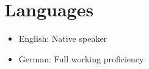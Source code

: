 \documentclass[10pt,a4paper]{article}
\begin{document}
\vspace{1.2em}

\section*{Languages}
\begin{itemize}
    \item English: Native speaker
    \item German: Full working proficiency
\end{itemize}
\end{document}
